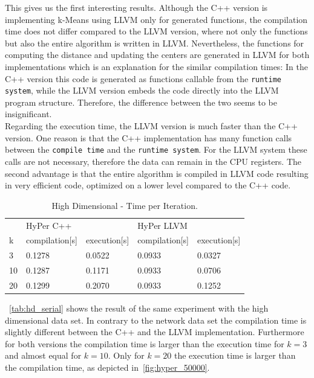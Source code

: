 This gives us the first interesting results. Although the C++ version is implementing k-Means using LLVM only for generated functions, the compilation time does not differ compared to the LLVM version, where not only the functions but also the entire algorithm is written in LLVM. Nevertheless, the functions for computing the distance and updating the centers are generated in LLVM for both implementations which is an explanation for the similar compilation times: In the C++ version this code is generated as functions callable from the \texttt{runtime system}, while the LLVM version embeds the code directly into the LLVM program structure. Therefore, the difference between the two seems to be insignificant.
\\
Regarding the execution time, the LLVM version is much faster than the C++ version. One reason is that the C++ implementation has many function calls between the \texttt{compile time} and the \texttt{runtime system}. For the LLVM system these calls are not necessary, therefore the data can remain in the CPU registers. The second advantage is that the entire algorithm is compiled in LLVM code resulting in very efficient code, optimized on a lower level compared to the C++ code.


\begin{table}[htsb]
  \caption[High Dimensional - Time per Iteration]{High Dimensional - Time per Iteration.}\label{tab:hd_serial}
  \centering
  \begin{tabular}{l l l l l}
    \toprule
      & HyPer C++ & & HyPer LLVM & \\
      k & compilation[s] & execution[s] & compilation[s] & execution[s] \\
    \midrule
      3  & 0.1278 & 0.0522 & 0.0933 & 0.0327 \\
      10 & 0.1287 & 0.1171 & 0.0933 & 0.0706 \\
      20 & 0.1299 & 0.2070 & 0.0933 & 0.1252 \\
    \bottomrule
  \end{tabular}
\end{table}

~\autoref{tab:hd_serial} shows the result of the same experiment with the high dimensional data set. In contrary to the network data set the compilation time is slightly different between the C++ and the LLVM implementation. Furthermore for both versions the compilation time is larger than the execution time for $k = 3$ and almost equal for $k = 10$. Only for $k = 20$ the execution time is larger than the compilation time, as depicted in~\autoref{fig:hyper_50000}.

